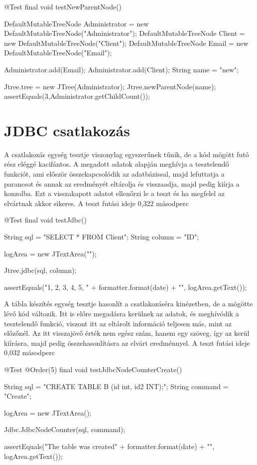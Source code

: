 \begin{java}
@Test
final void testNewParentNode() {
	DefaultMutableTreeNode Administrator =
	 new DefaultMutableTreeNode("Administrator");
	DefaultMutableTreeNode Client =
	 new DefaultMutableTreeNode("Client");
	DefaultMutableTreeNode Email =
	 new DefaultMutableTreeNode("Email");
	
	Administrator.add(Email);
	Administrator.add(Client);
	String name = "new";
	
	Jtree.tree = new JTree(Administrator);
	Jtree.newParentNode(name);
	assertEquals(3,Administrator.getChildCount());
}	
\end{java}

\section{JDBC csatlakozás}

A csatlakozás egység tesztje viszonylag egyszerűnek tűnik, de a kód mögött futó rész eléggé kacifántos. A megadott adatok alapján meghívja a tesztelendő funkciót, ami először összekapcsolódik az adatbázissal, majd lefuttatja a parancsot és annak az eredményét eltárolja és visszaadja, majd pedig kiírja a konzolba. Ezt a visszakapott adatot ellenőrzi le a teszt és ha megfelel az elvártnak akkor sikeres. A teszt futási ideje 0,322 másodperc

\begin{java}
@Test
final void testJdbc() {
	
	String sql = "SELECT * FROM Client";
	String column = "ID";
	
	logArea = new JTextArea("");
	
	Jtree.jdbc(sql, column);
	
	assertEquals("1,  2,  3,  4,  5,  "
	 + formatter.format(date) + "\n", logArea.getText());
	
}	
\end{java}


A tábla készítés egység tesztje hasonlít a csatlakozáséra kinézetben, de a mögötte lévő kód változik. Itt is előre megadásra kerülnek az adatok, és meghívódik a tesztelendő funkció, viszont itt az eltárolt információ teljesen más, mint az előzőnél. Az itt visszajövő érték nem egész szám, hanem egy szöveg, így az kerül kiírásra, majd pedig összehasonlításra az elvárt eredménnyel. A teszt futási ideje 0,032 másodperc

\begin{java}
@Test
@Order(5)
final void testJdbcNodeCounterCreate() {
	String sql = "CREATE TABLE B (id int, id2 INT);";
	String command = "Create";
	
	logArea = new JTextArea();
	
	Jdbc.JdbcNodeCounter(sql, command);
	
	assertEquals("The table was created" +
	 formatter.format(date) + "\n", logArea.getText());
}	
\end{java}
